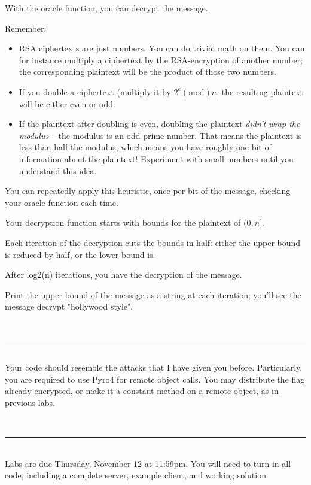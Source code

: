 \documentclass[11pt,oneside]{article}
\newcommand{\sectionfont}{phv} %
\renewcommand{\section}[1] {
    \vspace{12pt}{\quad\fontfamily{\sectionfont}\selectfont\Large\scshape\textbf{#1}}\\[-10pt]
    \vspace{8pt}\rule{\textwidth}{1pt}\\[-16pt]

}
\begin{document}
With the oracle function, you can decrypt the message.

Remember:
\begin{itemize}
	\item RSA ciphertexts are just numbers. You can do trivial math on them. You
		can for instance multiply a ciphertext by the RSA-encryption of another
		number; the corresponding plaintext will be the product of those two
		numbers.
	\item If you double a ciphertext (multiply it by $2^e (\mathrm{mod}) n$, the resulting
		plaintext will be either even or odd.
	\item If the plaintext after doubling is even, doubling the plaintext
		\textit{didn't wrap the modulus} -- the modulus is an odd prime number. That
		means the plaintext is less than half the modulus, which means you have
		roughly one bit of information about the plaintext! Experiment with small
		numbers until you understand this idea.
\end{itemize}

You can repeatedly apply this heuristic, once per bit of the message, checking
your oracle function each time.

Your decryption function starts with bounds for the plaintext of $(0, n]$.

Each iteration of the decryption cuts the bounds in half: either the upper bound
is reduced by half, or the lower bound is.

After log2(n) iterations, you have the decryption of the message.

Print the upper bound of the message as a string at each iteration; you'll see
the message decrypt "hollywood style".

\section{Rules}

Your code should resemble the attacks that I have given you before.
Particularly, you are required to use Pyro4 for remote object calls. You may
distribute the flag already-encrypted, or make it a constant method on a remote
object, as in previous labs.

\section{Grading}
Labs are due Thursday, November 12 at 11:59pm. You will need to turn in
all code, including a complete server, example client, and working solution.
\end{document}
